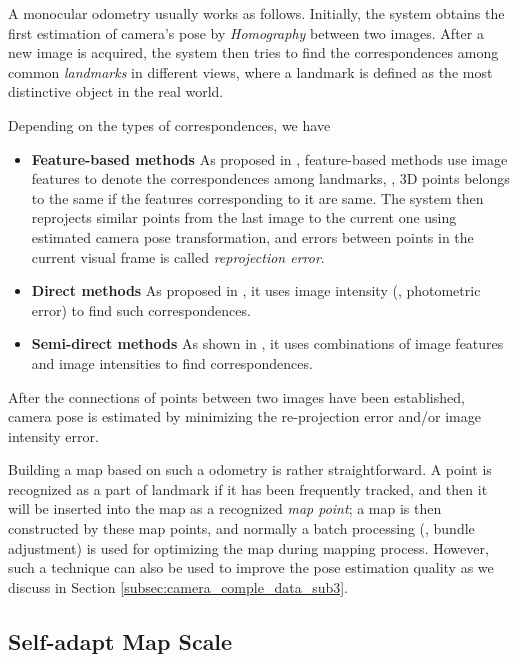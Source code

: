 A monocular odometry usually works as follows. Initially, the system obtains the first estimation of camera's pose by \textit{Homography} \cite{wiki:Homography} between two images. After a new image is acquired, the system then tries to find the correspondences among common \textit{landmarks} in different views, where a landmark is defined as the most distinctive object in the real world. 

Depending on the types of correspondences, we have
\begin{itemize}
\item {\textbf{Feature-based methods} As proposed in \cite{davison2007monoslam, eade2007monocular, klein2007parallel, mur2015orb}, feature-based methods use image features to denote the correspondences among landmarks, \eg, 3D points belongs to the same if the features corresponding to it are same. The system then reprojects similar points from the last image to the current one using estimated camera pose transformation, and errors between points in the current visual frame is called \textit{reprojection error}.}
\item {\textbf{Direct methods} As proposed in \cite{engel2014lsd}, it uses image intensity (\eg, photometric error) to find such correspondences.}
\item {\textbf{Semi-direct methods} As shown in \cite{forster2014svo}, it uses combinations of image features and image intensities to find correspondences.}
\end{itemize}
After the connections of points between two images have been established, camera pose is estimated by minimizing the re-projection error and/or image intensity error.

Building a map based on such a odometry is rather straightforward. A point is recognized as a part of landmark if it has been frequently tracked, and then it will be inserted into the map as a recognized \textit{map point}; a map is then constructed by these map points, and normally a batch processing (\eg, bundle adjustment) is used for optimizing the map during mapping process. However, such a technique can also be used to improve the pose estimation quality as we discuss in Section \ref{subsec:camera_comple_data_sub3}.

\subsection{Self-adapt Map Scale}
\label{subsec:camera_comple_data_sub2}

